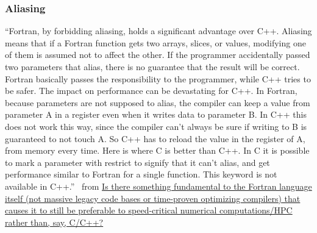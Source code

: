 \documentclass{beamer}
\begin{document}
\begin{darkframes}
  \begin{frame}[label=aliasing]
    \frametitle{Aliasing}
    \footnotesize{``Fortran, by forbidding aliasing, holds a significant advantage over C++. Aliasing means that if a Fortran function gets two arrays, slices, or values, modifying one of them is assumed not to affect the other. If the programmer accidentally passed two parameters that alias, there is no guarantee that the result will be correct. Fortran basically passes the responsibility to the programmer, while C++ tries to be safer. The impact on performance can be devastating for C++. In Fortran, because parameters are not supposed to alias, the compiler can keep a value from parameter A in a register even when it writes data to parameter B. In C++ this does not work this way, since the compiler can’t always be sure if writing to B is guaranteed to not touch A. So C++ has to reload the value in the register of A, from memory every time. Here is where C is better than C++. In C it is possible to mark a parameter with restrict to signify that it can’t alias, and get performance similar to Fortran for a single function. This keyword is not available in C++.''}
    \vfill
    \textemdash\ from \href{https://www.quora.com/Is-there-something-fundamental-to-the-Fortran-language-itself-not-massive-legacy-code-bases-or-time-proven-optimizing-compilers-that-causes-it-to-still-be-preferable-to-speed-critical-numerical-computations-HPC}{Is there something fundamental to the Fortran language itself (not massive legacy code bases or time-proven optimizing compilers) that causes it to still be preferable to speed-critical numerical computations/HPC rather than, say, C/C++?}

    \hyperlink{features}{}
    \addtocounter{framenumber}{-1}
  \end{frame}
  

\end{darkframes}
\end{document}
